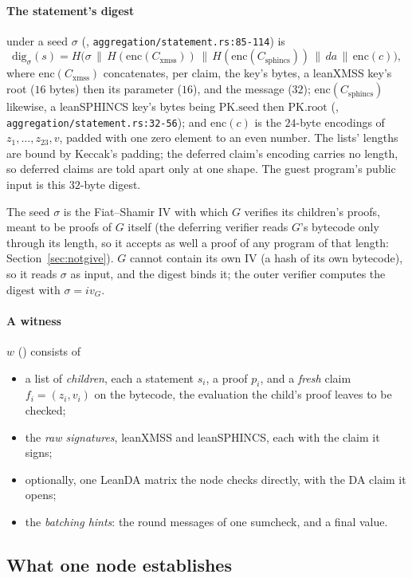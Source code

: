 \documentclass[11pt]{article}
\newcommand{\Cx}{C_{\mathrm{xmss}}}
\newcommand{\Cs}{C_{\mathrm{sphincs}}}
\newcommand{\enc}{\mathrm{enc}}
\begin{document}
\paragraph{The statement's digest} under a seed $\sigma$ (,
\texttt{aggregation/statement.rs:85-114}) is
\[
\mathrm{dig}_\sigma(s) = H\big(\sigma \,\|\, H(\enc(\Cx)) \,\|\, H(\enc(\Cs)) \,\|\, \mathit{da} \,\|\, \enc(c)\big),
\]
where $\enc(\Cx)$ concatenates, per claim, the key's bytes, a leanXMSS key's root ($16$ bytes)
then its parameter ($16$), and the message ($32$); $\enc(\Cs)$ likewise, a leanSPHINCS key's bytes
being $\mathrm{PK.seed}$ then $\mathrm{PK.root}$ (,
\texttt{aggregation/statement.rs:32-56}); and $\enc(c)$ is the $24$-byte encodings of
$z_1, \dots, z_{23}, v$,
padded with one zero element to an even number. The lists' lengths are bound by Keccak's padding;
the deferred claim's encoding carries no length, so deferred claims are told apart only at one
shape. The guest program's public input is this $32$-byte digest.

The seed $\sigma$ is the Fiat--Shamir IV with which $G$ verifies its children's proofs, meant to be
proofs of $G$ itself (the deferring verifier reads $G$'s bytecode only through its length, so it
accepts as well a proof of any program of that length: Section~\ref{sec:notgive}). $G$ cannot contain its own IV (a hash of its own bytecode), so it reads
$\sigma$ as input, and the digest binds it; the outer verifier computes the digest with
$\sigma = iv_G$.

\paragraph{A witness} $w$ () consists of
\begin{itemize}
\item a list of \emph{children}, each a statement $s_i$, a proof $p_i$, and a \emph{fresh} claim
$f_i = (z_i, v_i)$ on the bytecode, the evaluation the child's proof leaves to be checked;
\item the \emph{raw signatures}, leanXMSS and leanSPHINCS, each with the claim it signs;
\item optionally, one LeanDA matrix the node checks directly, with the DA claim it opens;
\item the \emph{batching hints}: the round messages of one sumcheck, and a final value.
\end{itemize}

\subsection{What one node establishes}
\end{document}

